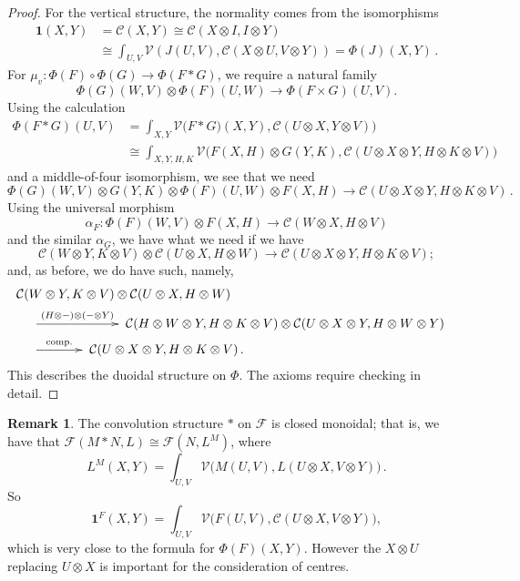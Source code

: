 \documentclass[a4paper,12pt]{article}
\theoremstyle{definition}
\newtheorem*{Remark}{Remark}%
\theoremstyle{fact}
\theoremstyle{genquest}
\theoremstyle{step}
\newcommand{\catI}{\mathbf{1}}
\newcommand{\catC}{\mathcal{C}}
\newcommand{\catF}{\mathcal{F}}
\newcommand{\catV}{\mathcal{V}}
\newcommand{\longto}{\longrightarrow}
\begin{document}
\begin{proof}
%
For the vertical structure, the normality comes from the isomorphisms
\begin{align*}
 \catI (X,Y) &= \catC (X,Y) \cong \catC (X \otimes I, I \otimes Y)
 \\
   &\cong \int_{U,V} \catV (J(U,V),\catC(X\otimes U, V \otimes Y)) = \Phi (J) (X,Y)\,.
\end{align*}
For $\mu_v : \Phi (F) \circ \Phi (G) \to \Phi (F \ast G)$, we require a natural family
\[
\Phi (G) (W,V) \otimes \Phi (F) (U,W) \to \Phi (F \times G) (U,V).
\]
%
Using the calculation
\begin{align*}
 \Phi (F \ast G) (U,V) &= \int_{X,Y} \catV \bigl(F \ast G) (X,Y), \catC (U \otimes X, Y \otimes V)\bigr)
\\
 &\cong \int_{X,Y,H,K} \catV \bigl(F(X,H)\otimes G(Y,K),\catC (U\otimes X \otimes Y, H \otimes K \otimes V)\bigr)
\end{align*}
and a middle-of-four isomorphism, we see that we need
\[
\Phi (G) (W,V) \otimes G(Y,K) \otimes \Phi (F) (U,W) \otimes F (X,H) \longto \catC (U \otimes X \otimes Y, H \otimes K \otimes V)\,.
\]
Using the universal morphism
\[
\alpha^{}_F : \Phi (F) (W,V) \otimes F (X,H) \longto \catC (W \otimes X, H \otimes V)
\]
and the similar $\alpha^{}_G$, we have what we need if we have
\[
\catC (W \otimes Y,K \otimes V) \otimes \catC (U \otimes X, H \otimes W) 
 \longto \catC (U \otimes X \otimes Y, H \otimes K \otimes V);
\]
and, as before, we do have such, namely, 
\begin{align*}
\lefteqn{\catC(W\otimes Y, K \otimes V) \otimes \catC (U \otimes X, H \otimes W) }
\\
 &&& \xymatrix @C+14mm { \ar[r]^{(H\otimes-)\otimes (-\otimes Y)}&}
\catC (H \otimes W \otimes Y, H \otimes K \otimes V) \otimes \catC (U \otimes X \otimes Y, H \otimes W \otimes Y)
\\
 &&& \xymatrix @C+4mm { \ar[r]^{\mathrm{comp.}} & } \catC (U\otimes X \otimes Y, H \otimes K \otimes V)\,.
\end{align*}
This describes the duoidal structure on $\Phi$.   
The axioms require checking in detail.
\end{proof} 

\begin{Remark}
The convolution structure $\ast$ on $\catF$ is closed monoidal;
that is, we have that $\catF (M \ast N, L) \cong \catF (N, L^M)$, where
\[
L^M (X,Y) = \int_{U,V} \catV \bigl(M(U,V),L(U\otimes X,V\otimes Y)\bigr)\,.
\]
So
\[
\catI^F (X,Y) = \int_{U,V} \catV \bigl(F(U,V),\catC(U\otimes X, V \otimes Y)\bigr),
\]
which is very close to the formula for $\Phi (F) (X,Y)$.    
However the $X \otimes U$ replacing $U \otimes X$ is important for the consideration of centres.
\end{Remark}
\end{document}

